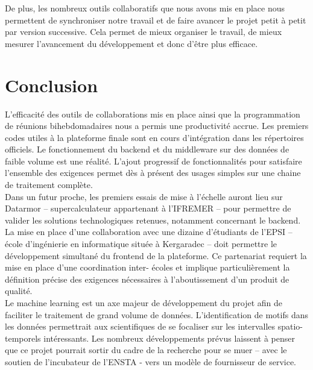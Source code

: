 \documentclass[a4paper]{article}
\begin{document}
De plus, les nombreux outils collaboratifs que nous avons mis en place nous permettent de
synchroniser notre travail et de faire avancer le projet petit à petit par version successive. Cela
permet de mieux organiser le travail, de mieux mesurer l’avancement du développement et
donc d’être plus efficace.

\section{Conclusion}

L’efficacité des outils de collaborations mis en place ainsi que la programmation de
réunions bihebdomadaires nous a permis une productivité accrue. Les premiers codes utiles à la
plateforme finale sont en cours d’intégration dans les répertoires officiels. Le fonctionnement du
backend et du middleware sur des données de faible volume est une réalité. L’ajout progressif de
fonctionnalités pour satisfaire l’ensemble des exigences permet dès à présent des usages simples
sur une chaine de traitement complète.
\\

Dans un futur proche, les premiers essais de mise à l’échelle auront lieu sur Datarmor –
supercalculateur appartenant à l’IFREMER – pour permettre de valider les solutions
technologiques retenues, notamment concernant le backend.
\\

La mise en place d’une collaboration avec une dizaine d’étudiants de l’EPSI – école
d'ingénierie en informatique située à Kergaradec – doit permettre le développement simultané
du frontend de la plateforme. Ce partenariat requiert la mise en place d’une coordination inter-
écoles et implique particulièrement la définition précise des exigences nécessaires à
l’aboutissement d’un produit de qualité.
\\

Le machine learning est un axe majeur de développement du projet afin de faciliter le
traitement de grand volume de données. L’identification de motifs dans les données permettrait
aux scientifiques de se focaliser sur les intervalles spatio-temporels intéressants. Les nombreux
développements prévus laissent à penser que ce projet pourrait sortir du cadre de la recherche
pour se muer – avec le soutien de l’incubateur de l’ENSTA - vers un modèle de fournisseur de
service.

\listoffigures

\listoftables
\end{document}
